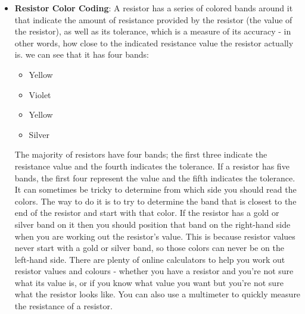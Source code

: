 \documentclass{report}
\begin{document}
\begin{itemize}
\begin{itemize}
                \item E192 series (tolerance 0.5\%, 0.25\% and 0.1\%)
            \end{itemize}
            Don't worry about what resistor tolerance means at this stage, we cover that later on.
            \bigbreak \noindent 
            The following table shows the resistor values that conform to the E12 series, which is the most popular of the E series.
            \bigbreak \noindent 
            \bigbreak \noindent 
            In the above table 'k' stands for kilo-ohm (1,000 ohms), and 'M' stands for mega-ohm (1,000,000 ohms).
        \item \textbf{Resistor Color Coding}: A resistor has a series of colored bands around it that indicate the amount of resistance provided by the resistor (the value of the resistor), as well as its tolerance, which is a measure of its accuracy - in other words, how close to the indicated resistance value the resistor actually is.
            \bigbreak \noindent 
            \bigbreak \noindent 
            we can see that it has four bands:
            \begin{itemize}
                \item Yellow
                \item Violet
                \item Yellow
                \item Silver
            \end{itemize}
            The majority of resistors have four bands; the first three indicate the resistance value and the fourth indicates the tolerance. If a resistor has five bands, the first four represent the value and the fifth indicates the tolerance.
            \bigbreak \noindent 
            It can sometimes be tricky to determine from which side you should read the colors. The way to do it is to try to determine the band that is closest to the end of the resistor and start with that color. If the resistor has a gold or silver band on it
            \bigbreak \noindent 
            then you should position that band on the right-hand side when you are working out the resistor's value. This is because resistor values never start with a gold or silver band, so those colors can never be on the left-hand side.
            \bigbreak \noindent 
            There are plenty of online calculators to help you work out resistor values and colours - whether you have a resistor and you're not sure what its value is, or if you know what value you want but you're not sure what the resistor looks like. You can also use a multimeter to quickly measure the resistance of a resistor.

\end{itemize}
\end{document}
